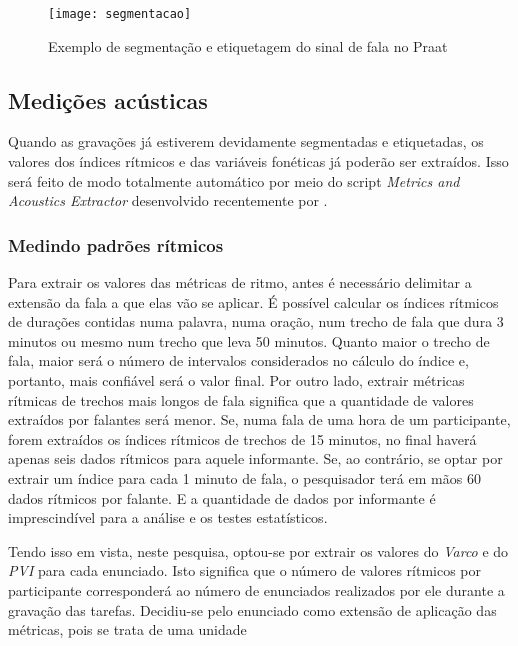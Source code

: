 \documentclass[12pt,a4paper,oneside]{article}
\begin{document}
	\begin{figure}[h]
	    \caption{Exemplo de segmentação e etiquetagem do sinal de fala no Praat}
	    \label{f1}
	    \centering
	    \texttt{[image: segmentacao]}	
	\end{figure}

	\subsection{Medições acústicas}

	Quando as gravações já estiverem devidamente segmentadas e etiquetadas, os valores dos
	índices rítmicos e das variáveis fonéticas já poderão ser extraídos. Isso será feito de modo
	totalmente automático por meio do script \emph{Metrics and Acoustics Extractor} desenvolvido
	recentemente por \citet{Junior.Barbosa2019}.

	    \subsubsection{Medindo padrões rítmicos}

	    Para extrair os valores das métricas de ritmo, antes é necessário delimitar a extensão
	    da fala a que elas vão se aplicar. É possível calcular os índices rítmicos de durações
	    contidas numa palavra, numa oração, num trecho de fala que dura 3 minutos ou mesmo num
	    trecho que leva 50 minutos. Quanto maior o trecho de fala, maior será o número de
	    intervalos considerados no cálculo do índice e, portanto, mais confiável será o valor
	    final. Por outro lado, extrair métricas rítmicas de trechos mais longos de fala
	    significa que a quantidade de valores extraídos por falantes será menor. Se, numa fala
	    de uma hora de um participante, forem extraídos os índices rítmicos de trechos de 15
	    minutos, no final haverá apenas seis dados rítmicos para aquele informante. Se, ao
	    contrário, se optar por extrair um índice para cada 1 minuto de fala, o pesquisador terá
	    em mãos 60 dados rítmicos por falante. E a quantidade de dados por informante é
	    imprescindível para a análise e os testes estatísticos.

	    Tendo isso em vista, neste pesquisa, optou-se por extrair os valores do \emph{Varco} e
	    do \emph{PVI} para cada enunciado. Isto significa que o número de valores rítmicos por
	    participante corresponderá ao número de enunciados realizados por ele durante
	    a gravação das tarefas. Decidiu-se pelo enunciado como extensão de aplicação das
	    métricas, pois se trata de uma unidade 
\end{document}
